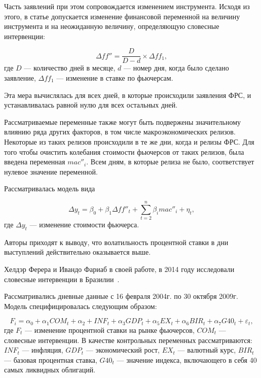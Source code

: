 \documentclass[14pt,a4paper, oneside]{extreport}
\def \a{\alpha}
\newcommand{\e}{\varepsilon}
\def \Dt{\Delta}
\theoremstyle{plain}              %
\theoremstyle{definition}         %
\begin{document}
Часть заявлений при этом сопровождается изменением инструмента. Исходя из этого, в статье допускается изменение финансовой переменной на величину инструмента и на неожиданную величину, определяющую словесные интервенции: 

\begin{equation}
\Dt ff'' = \frac{D}{D-d} \times \Dt ff_1,
\end{equation} где $D$ --- количество дней в месяце, $d$ --- номер дня, когда было сделано заявление, $\Dt ff_1$ --- изменение в ставке по фьючерсам.

Эта мера вычислялась для всех дней, в которые происходили заявления ФРС, и устанавливалась равной нулю для всех остальных дней.  

Рассматриваемые переменные также могут быть подвержены значительному влиянию ряда других факторов, в том числе макроэкономических релизов. Некоторые из таких релизов происходили в те же дни, когда и релизы ФРС. Для того чтобы очистить колебания стоимости фьючерсов от таких релизов, была введена переменная $mac''_i$.  Всем дням, в которые релиза не было, соответствует нулевое значение переменной. 

Рассматривалась модель вида

\begin{equation}
\Dt y_t = \beta_0 + \beta_1 \Dt ff''_t + \sum_{t=2}^{n} \beta_i mac''_i + \eta_t,
\end{equation} где $\Dt y_t$ --- изменение стоимости фьючерса.

Авторы приходят к выводу, что волатильность процентной ставки в дни выступлений действительно оказывается выше.

Хелдэр Ферера и Ивандо Фариаб в своей работе, в 2014 году исследовали словесные интервенции в Бразилии~\cite{de2015brazilian}.

 Рассматривались дневные данные с 16 февраля 2004г. по 30 октября 2009г. Модель специфицировалась следующим образом:

\begin{equation}
F_i = \a_0 + \a_1 COM_t + \a_2 + INF_t + \a_3 GDP_t + \a_5 EX_t + \a_6 BIR_t + \a_7 G40_t + \e_t,
\end{equation} где $F_t$ --- изменение процентной ставки на рынке фьючерсов, $COM_t$ --- словесные интервенции. В качестве контрольных переменных рассматриваются: $INF_t$ --- инфляция, $GDP_t$ --- экономический рост, $EX_t$ --- валютный курс, $BIR_t$ --- базовая процентная ставка, $G40_t$ --- значение индекса, включающего в себя 40 самых ликвидных облигаций.  
\end{document}
